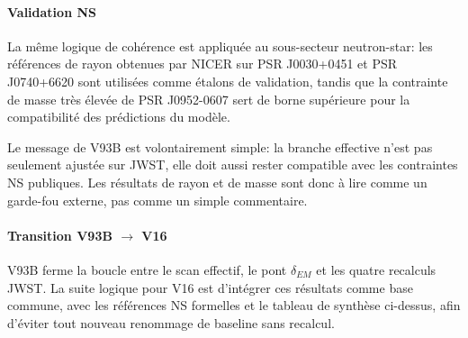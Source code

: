 \paragraph{Validation NS}
La même logique de cohérence est appliquée au sous-secteur neutron-star: les références de rayon obtenues par NICER sur PSR J0030+0451 et PSR J0740+6620 \cite{nicer0030,nicer0740} sont utilisées comme étalons de validation, tandis que la contrainte de masse très élevée de PSR J0952-0607 \cite{j0952} sert de borne supérieure pour la compatibilité des prédictions du modèle.

Le message de V93B est volontairement simple: la branche effective n'est pas seulement ajustée sur JWST, elle doit aussi rester compatible avec les contraintes NS publiques. Les résultats de rayon et de masse sont donc à lire comme un garde-fou externe, pas comme un simple commentaire.

\paragraph{Transition V93B \texorpdfstring{$\rightarrow$}{->} V16}
V93B ferme la boucle entre le scan effectif, le pont $\delta_{EM}$ et les quatre recalculs JWST. La suite logique pour V16 est d'intégrer ces résultats comme base commune, avec les références NS formelles et le tableau de synthèse ci-dessus, afin d'éviter tout nouveau renommage de baseline sans recalcul.
